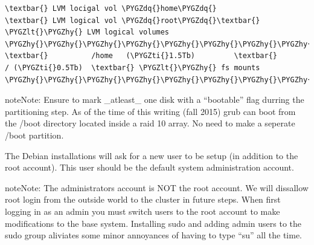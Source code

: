 \documentclass[letterpaper,10pt,english]{sphinxmanual}
\def\PYGZlt{\char`\<}
\def\PYGZhy{\char`\-}
\def\PYGZdq{\char`\"}
\def\PYGZti{\char`\~}
\begin{document}
\begin{Verbatim}[commandchars=\\\{\}]
\textbar{} LVM locigal vol \PYGZdq{}home\PYGZdq{}            \textbar{} LVM logical vol \PYGZdq{}root\PYGZdq{}\textbar{} \PYGZlt{}\PYGZhy{} LVM logical volumes
\PYGZhy{}\PYGZhy{}\PYGZhy{}\PYGZhy{}\PYGZhy{}\PYGZhy{}\PYGZhy{}\PYGZhy{}\PYGZhy{}\PYGZhy{}\PYGZhy{}\PYGZhy{}\PYGZhy{}\PYGZhy{}\PYGZhy{}\PYGZhy{}\PYGZhy{}\PYGZhy{}\PYGZhy{}\PYGZhy{}\PYGZhy{}\PYGZhy{}\PYGZhy{}\PYGZhy{}\PYGZhy{}\PYGZhy{}\PYGZhy{}\PYGZhy{}\PYGZhy{}\PYGZhy{}\PYGZhy{}\PYGZhy{}\PYGZhy{}\PYGZhy{}\PYGZhy{}\PYGZhy{}\PYGZhy{}\PYGZhy{}\PYGZhy{}\PYGZhy{}\PYGZhy{}\PYGZhy{}\PYGZhy{}\PYGZhy{}\PYGZhy{}\PYGZhy{}\PYGZhy{}\PYGZhy{}\PYGZhy{}\PYGZhy{}\PYGZhy{}\PYGZhy{}\PYGZhy{}\PYGZhy{}\PYGZhy{}\PYGZhy{}\PYGZhy{}\PYGZhy{}\PYGZhy{}\PYGZhy{}\PYGZhy{}
\textbar{}          /home   (\PYGZti{}1.5Tb)         \textbar{}           / (\PYGZti{}0.5Tb)  \textbar{} \PYGZlt{}\PYGZhy{} fs mounts
\PYGZhy{}\PYGZhy{}\PYGZhy{}\PYGZhy{}\PYGZhy{}\PYGZhy{}\PYGZhy{}\PYGZhy{}\PYGZhy{}\PYGZhy{}\PYGZhy{}\PYGZhy{}\PYGZhy{}\PYGZhy{}\PYGZhy{}\PYGZhy{}\PYGZhy{}\PYGZhy{}\PYGZhy{}\PYGZhy{}\PYGZhy{}\PYGZhy{}\PYGZhy{}\PYGZhy{}\PYGZhy{}\PYGZhy{}\PYGZhy{}\PYGZhy{}\PYGZhy{}\PYGZhy{}\PYGZhy{}\PYGZhy{}\PYGZhy{}\PYGZhy{}\PYGZhy{}\PYGZhy{}\PYGZhy{}\PYGZhy{}\PYGZhy{}\PYGZhy{}\PYGZhy{}\PYGZhy{}\PYGZhy{}\PYGZhy{}\PYGZhy{}\PYGZhy{}\PYGZhy{}\PYGZhy{}\PYGZhy{}\PYGZhy{}\PYGZhy{}\PYGZhy{}\PYGZhy{}\PYGZhy{}\PYGZhy{}\PYGZhy{}\PYGZhy{}\PYGZhy{}\PYGZhy{}\PYGZhy{}\PYGZhy{}
\end{Verbatim}

\begin{notice}{note}{Note:}
Ensure to mark \_atleast\_ one disk with a ``bootable'' flag durring the partitioning step.
As of the time of this writing (fall 2015) grub can boot from the /boot directory located
inside a raid 10 array.  No need to make a seperate /boot partition.
\end{notice}

The Debian installations will ask
for a new user to be setup  (in addition to the root account).  This user should be the default
system administration account.

\begin{notice}{note}{Note:}
The administrators account is NOT the root account.  We will dissallow root login from the
outside world to the cluster in future steps.  When first logging in as an admin
you must switch users to the root account to make modifications
to the base system.  Installing sudo and adding admin users to the sudo group aliviates some
minor annoyances of having to type ``su'' all the time.
\end{notice}
\end{document}
